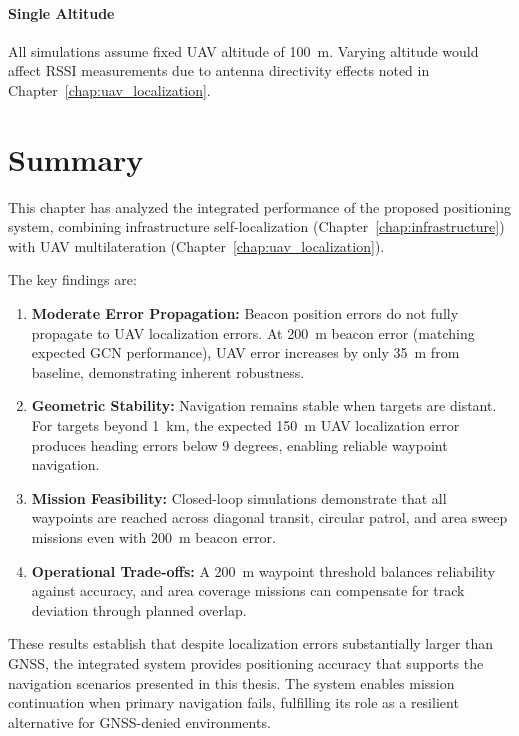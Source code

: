 \documentclass[master,final,11pt]{iscs-thesis}
\begin{document}
\paragraph{Single Altitude}
All simulations assume fixed UAV altitude of 100~m.
Varying altitude would affect RSSI measurements due to antenna directivity effects noted in Chapter~\ref{chap:uav_localization}.

\section{Summary}
\label{sec:integration_summary}

This chapter has analyzed the integrated performance of the proposed positioning system, combining infrastructure self-localization (Chapter~\ref{chap:infrastructure}) with UAV multilateration (Chapter~\ref{chap:uav_localization}).

The key findings are:

\begin{enumerate}
    \item \textbf{Moderate Error Propagation:} Beacon position errors do not fully propagate to UAV localization errors.
    At 200~m beacon error (matching expected GCN performance), UAV error increases by only 35~m from baseline, demonstrating inherent robustness.
    
    \item \textbf{Geometric Stability:} Navigation remains stable when targets are distant.
    For targets beyond 1~km, the expected 150~m UAV localization error produces heading errors below 9 degrees, enabling reliable waypoint navigation.
    
    \item \textbf{Mission Feasibility:} Closed-loop simulations demonstrate that all waypoints are reached across diagonal transit, circular patrol, and area sweep missions even with 200~m beacon error.
    
    \item \textbf{Operational Trade-offs:} A 200~m waypoint threshold balances reliability against accuracy, and area coverage missions can compensate for track deviation through planned overlap.
\end{enumerate}

These results establish that despite localization errors substantially larger than GNSS, the integrated system provides positioning accuracy that supports the navigation scenarios presented in this thesis.
The system enables mission continuation when primary navigation fails, fulfilling its role as a resilient alternative for GNSS-denied environments.
\end{document}
